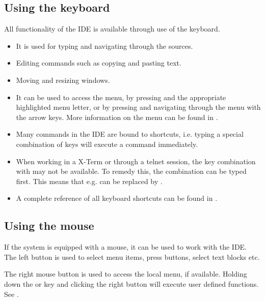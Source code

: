 \subsection{Using the keyboard}
All functionality of the IDE is available through use of the keyboard.
\begin{itemize}
\item It is used for typing and navigating through the sources.
\item Editing commands such as copying and pasting text.
\item Moving and resizing windows.
\item It can be used to access the menu, by pressing  and the
appropriate highlighted menu letter, or by pressing  and
navigating through the menu with the arrow keys.
More information on the menu can be found in .
\item Many commands in the IDE are bound to shortcuts, i.e. typing a special
combination of keys will execute a command immediately.
\end{itemize}
\begin{remark}
\begin{itemize}
\item When working in a \linux X-Term or through a telnet session, the
key combination with  may not be available. To remedy this, the
 combination can be typed first. This means that e.g. 
can be replaced by .
\item A complete reference of all keyboard shortcuts can be found in
.
\end{itemize}
\end{remark}
%
%
\subsection{Using the mouse}
\label{suse:mouseusage}
If the system is equipped with a mouse, it can be used to work with the
IDE. The left button is used to select menu items, press buttons, select
text blocks etc.

The right mouse button is used to access the local menu, if available.
Holding down the  or  key and clicking the right
button will execute user defined functions. See .

